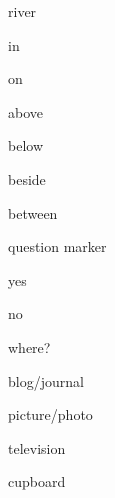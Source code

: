 \begin{flashcard}{\LARGE river}
\LARGE {}
\end{flashcard}
\begin{flashcard}{\LARGE in}
\LARGE {}
\end{flashcard}
\begin{flashcard}{\LARGE on}
\LARGE {}
\end{flashcard}
\begin{flashcard}{\LARGE above}
\LARGE {}
\end{flashcard}
\begin{flashcard}{\LARGE below}
\LARGE {}
\end{flashcard}
\begin{flashcard}{\LARGE beside}
\LARGE {}
\end{flashcard}
\begin{flashcard}{\LARGE between}
\LARGE {}
\end{flashcard}
\begin{flashcard}{\LARGE question marker}
\LARGE {}
\end{flashcard}
\begin{flashcard}{\LARGE yes}
\LARGE {}
\end{flashcard}
\begin{flashcard}{\LARGE no}
\LARGE {}
\end{flashcard}
\begin{flashcard}{\LARGE where?}
\LARGE {}
\end{flashcard}
\begin{flashcard}{\LARGE blog/journal}
\LARGE {}
\end{flashcard}
\begin{flashcard}{\LARGE picture/photo}
\LARGE {}
\end{flashcard}
\begin{flashcard}{\LARGE television}
\LARGE {}
\end{flashcard}
\begin{flashcard}{\LARGE cupboard}
\LARGE {}
\end{flashcard}
